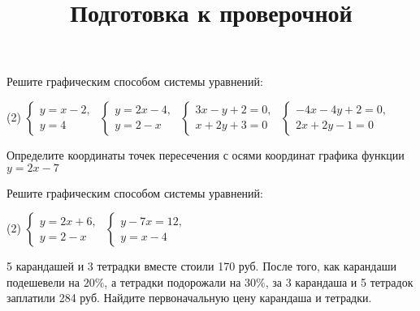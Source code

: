 \begin{class}[number=7]
	\title{Подготовка к проверочной}
	\begin{listofex}
		\item Решите графическим способом системы уравнений:
		\begin{tasks}(2)
			\task \( \begin{cases} y=x-2,\\y=4 \end{cases} \)
			\task \( \begin{cases} y=2x-4,\\y=2-x \end{cases} \)
			\task \( \begin{cases} 3x-y+2=0,\\x+2y+3=0 \end{cases} \)
			\task \( \begin{cases} -4x-4y+2=0,\\2x+2y-1=0 \end{cases} \)
		\end{tasks}
		\item Определите координаты точек пересечения с осями координат графика функции \( y=2x-7 \)
		\item Решите графическим способом системы уравнений:
		\begin{tasks}(2)
			\task \( \begin{cases} y=2x+6,\\y=2-x \end{cases} \)
			\task \( \begin{cases} y-7x=12,\\y=x-4 \end{cases} \)
		\end{tasks}
		\item 5 карандашей и 3 тетрадки вместе стоили 170 руб. После того, как карандаши подешевели на \( 20\% \), а тетрадки подорожали на \( 30\% \), за 3 карандаша и 5 тетрадок заплатили 284 руб. Найдите первоначальную цену карандаша и тетрадки.
	\end{listofex}
\end{class}









